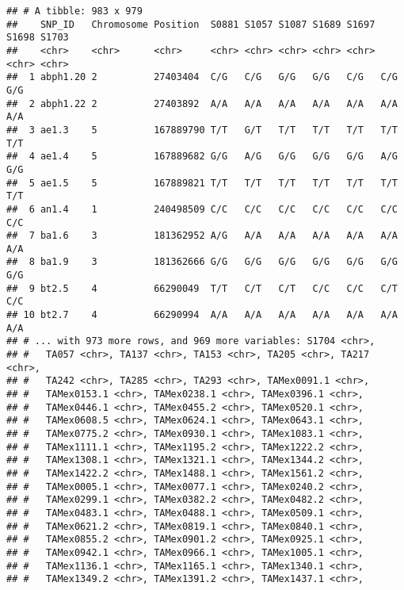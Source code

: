 \documentclass[]{article}
\newenvironment{Shaded}{\begin{snugshade}}{\end{snugshade}}
\newcommand{\KeywordTok}[1]{\textcolor[rgb]{0.13,0.29,0.53}{\textbf{#1}}}
\newcommand{\DataTypeTok}[1]{\textcolor[rgb]{0.13,0.29,0.53}{#1}}
\newcommand{\StringTok}[1]{\textcolor[rgb]{0.31,0.60,0.02}{#1}}
\newcommand{\CommentTok}[1]{\textcolor[rgb]{0.56,0.35,0.01}{\textit{#1}}}
\newcommand{\NormalTok}[1]{#1}
\begin{document}
\begin{Shaded}
\end{Shaded}

\begin{verbatim}
## # A tibble: 983 x 979
##    SNP_ID   Chromosome Position  S0881 S1057 S1087 S1689 S1697 S1698 S1703
##    <chr>    <chr>      <chr>     <chr> <chr> <chr> <chr> <chr> <chr> <chr>
##  1 abph1.20 2          27403404  C/G   C/G   G/G   G/G   C/G   C/G   G/G  
##  2 abph1.22 2          27403892  A/A   A/A   A/A   A/A   A/A   A/A   A/A  
##  3 ae1.3    5          167889790 T/T   G/T   T/T   T/T   T/T   T/T   T/T  
##  4 ae1.4    5          167889682 G/G   A/G   G/G   G/G   G/G   A/G   G/G  
##  5 ae1.5    5          167889821 T/T   T/T   T/T   T/T   T/T   T/T   T/T  
##  6 an1.4    1          240498509 C/C   C/C   C/C   C/C   C/C   C/C   C/C  
##  7 ba1.6    3          181362952 A/G   A/A   A/A   A/A   A/A   A/A   A/A  
##  8 ba1.9    3          181362666 G/G   G/G   G/G   G/G   G/G   G/G   G/G  
##  9 bt2.5    4          66290049  T/T   C/T   C/T   C/C   C/C   C/T   C/C  
## 10 bt2.7    4          66290994  A/A   A/A   A/A   A/A   A/A   A/A   A/A  
## # ... with 973 more rows, and 969 more variables: S1704 <chr>,
## #   TA057 <chr>, TA137 <chr>, TA153 <chr>, TA205 <chr>, TA217 <chr>,
## #   TA242 <chr>, TA285 <chr>, TA293 <chr>, TAMex0091.1 <chr>,
## #   TAMex0153.1 <chr>, TAMex0238.1 <chr>, TAMex0396.1 <chr>,
## #   TAMex0446.1 <chr>, TAMex0455.2 <chr>, TAMex0520.1 <chr>,
## #   TAMex0608.5 <chr>, TAMex0624.1 <chr>, TAMex0643.1 <chr>,
## #   TAMex0775.2 <chr>, TAMex0930.1 <chr>, TAMex1083.1 <chr>,
## #   TAMex1111.1 <chr>, TAMex1195.2 <chr>, TAMex1222.2 <chr>,
## #   TAMex1308.1 <chr>, TAMex1321.1 <chr>, TAMex1344.2 <chr>,
## #   TAMex1422.2 <chr>, TAMex1488.1 <chr>, TAMex1561.2 <chr>,
## #   TAMex0005.1 <chr>, TAMex0077.1 <chr>, TAMex0240.2 <chr>,
## #   TAMex0299.1 <chr>, TAMex0382.2 <chr>, TAMex0482.2 <chr>,
## #   TAMex0483.1 <chr>, TAMex0488.1 <chr>, TAMex0509.1 <chr>,
## #   TAMex0621.2 <chr>, TAMex0819.1 <chr>, TAMex0840.1 <chr>,
## #   TAMex0855.2 <chr>, TAMex0901.2 <chr>, TAMex0925.1 <chr>,
## #   TAMex0942.1 <chr>, TAMex0966.1 <chr>, TAMex1005.1 <chr>,
## #   TAMex1136.1 <chr>, TAMex1165.1 <chr>, TAMex1340.1 <chr>,
## #   TAMex1349.2 <chr>, TAMex1391.2 <chr>, TAMex1437.1 <chr>,

\end{verbatim}
\end{document}
